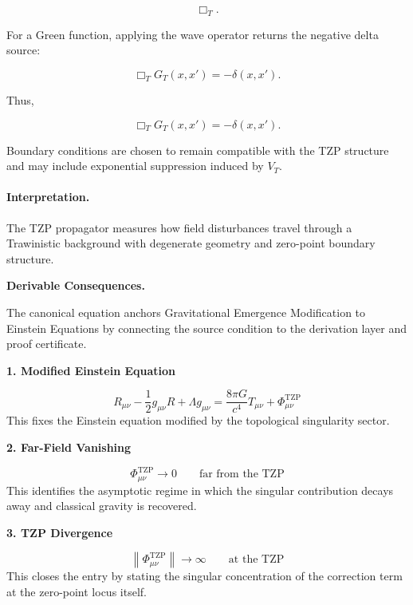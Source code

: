 \begin{equation}
\Box_T .
\end{equation}

For a Green function, applying the wave operator returns the negative delta source:

\begin{equation}
\Box_T G_T(x,x')
=
-\delta(x,x') .
\end{equation}

Thus,

\begin{equation}
\boxed{
\Box_T G_T(x,x')
=
-\delta(x,x') .
}
\end{equation}

Boundary conditions are chosen to remain compatible with the TZP structure and may include exponential suppression induced by $V_T$.

\paragraph{Interpretation.}
The TZP propagator measures how field disturbances travel through a Trawinistic background with degenerate geometry and zero-point boundary structure.

\par\vspace{0.35em}
\noindent\textbf{Derivable Consequences.}\quad
\begingroup
\footnotesize
\raggedright
The canonical equation anchors Gravitational Emergence Modification to Einstein Equations by connecting the source condition to the derivation layer and proof certificate.
\par\endgroup

\noindent\textbf{1. Modified Einstein Equation}\par
\[
R_{\mu\nu}-\frac{1}{2}g_{\mu\nu}R+\Lambda g_{\mu\nu}=\frac{8\pi G}{c^4}T_{\mu\nu}+\Phi_{\mu\nu}^{\mathrm{TZP}}
\]
\noindent This fixes the Einstein equation modified by the topological singularity sector.\par
\noindent\textbf{2. Far-Field Vanishing}\par
\[
\Phi_{\mu\nu}^{\mathrm{TZP}} \to 0 \qquad \text{far from the TZP}
\]
\noindent This identifies the asymptotic regime in which the singular contribution decays away and classical gravity is recovered.\par
\noindent\textbf{3. TZP Divergence}\par
\[
\left\|\Phi_{\mu\nu}^{\mathrm{TZP}}\right\| \to \infty \qquad \text{at the TZP}
\]
\noindent This closes the entry by stating the singular concentration of the correction term at the zero-point locus itself.\par


